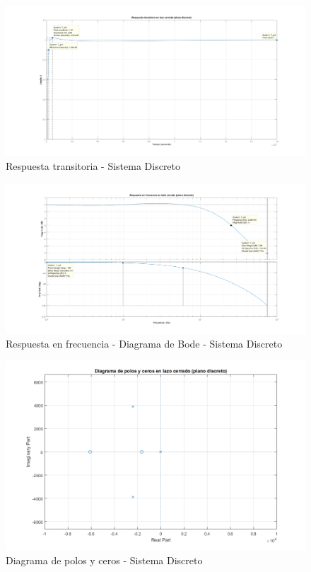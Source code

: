 \documentclass[12pt]{report}
\begin{document}
	\begin{figure}
		\centering
		\includegraphics[width=\textwidth,height=\textheight,keepaspectratio]{buck_step_response_discrete} 
		\caption{Respuesta transitoria - Sistema Discreto}
		\label{buck:step_discrete}
	\end{figure}
	
	\begin{figure}
		\centering
		\includegraphics[width=\textwidth,height=\textheight,keepaspectratio]{buck_bode_discrete} 
		\caption{Respuesta en frecuencia - Diagrama de Bode - Sistema Discreto}
		\label{buck:bode_discrete}
	\end{figure}
	
	\begin{figure}
		\centering
		\includegraphics[width=\textwidth,height=\textheight,keepaspectratio]{buck_polos_ceros_discrete}
		\caption{Diagrama de polos y ceros - Sistema Discreto}
		\label{buck:polos_ceros_discrete}
	\end{figure}
	
\end{document}
